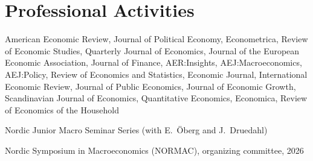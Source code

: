 \documentclass[11pt,a4paper]{article}
\newcommand{\entry}[2]{\item[\color{muted}#1] #2}
\begin{document}
\section{Professional Activities}

\begin{cvlist}
  \entry{Refereeing}{American Economic Review, Journal of Political Economy, Econometrica, Review of Economic Studies, Quarterly Journal of Economics, Journal of the European Economic Association, Journal of Finance, AER:Insights, AEJ:Macroeconomics, AEJ:Policy, Review of Economics and Statistics, Economic Journal, International Economic Review, Journal of Public Economics, Journal of Economic Growth, Scandinavian Journal of Economics, Quantitative Economics, Economica, Review of Economics of the Household}
  \vspace{3pt}
  \entry{Organizing}{Nordic Junior Macro Seminar Series (with E.~Öberg and J.~Druedahl)}
  \entry{}{Nordic Symposium in Macroeconomics (NORMAC), organizing committee, 2026}
\end{cvlist}


%
\end{document}
